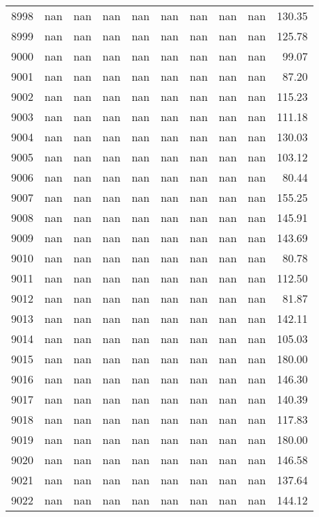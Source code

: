\begin{tabular}{lrrrrrrrrr}
8998 & nan & nan & nan & nan & nan & nan & nan & nan & 130.35 \\
8999 & nan & nan & nan & nan & nan & nan & nan & nan & 125.78 \\
9000 & nan & nan & nan & nan & nan & nan & nan & nan & 99.07 \\
9001 & nan & nan & nan & nan & nan & nan & nan & nan & 87.20 \\
9002 & nan & nan & nan & nan & nan & nan & nan & nan & 115.23 \\
9003 & nan & nan & nan & nan & nan & nan & nan & nan & 111.18 \\
9004 & nan & nan & nan & nan & nan & nan & nan & nan & 130.03 \\
9005 & nan & nan & nan & nan & nan & nan & nan & nan & 103.12 \\
9006 & nan & nan & nan & nan & nan & nan & nan & nan & 80.44 \\
9007 & nan & nan & nan & nan & nan & nan & nan & nan & 155.25 \\
9008 & nan & nan & nan & nan & nan & nan & nan & nan & 145.91 \\
9009 & nan & nan & nan & nan & nan & nan & nan & nan & 143.69 \\
9010 & nan & nan & nan & nan & nan & nan & nan & nan & 80.78 \\
9011 & nan & nan & nan & nan & nan & nan & nan & nan & 112.50 \\
9012 & nan & nan & nan & nan & nan & nan & nan & nan & 81.87 \\
9013 & nan & nan & nan & nan & nan & nan & nan & nan & 142.11 \\
9014 & nan & nan & nan & nan & nan & nan & nan & nan & 105.03 \\
9015 & nan & nan & nan & nan & nan & nan & nan & nan & 180.00 \\
9016 & nan & nan & nan & nan & nan & nan & nan & nan & 146.30 \\
9017 & nan & nan & nan & nan & nan & nan & nan & nan & 140.39 \\
9018 & nan & nan & nan & nan & nan & nan & nan & nan & 117.83 \\
9019 & nan & nan & nan & nan & nan & nan & nan & nan & 180.00 \\
9020 & nan & nan & nan & nan & nan & nan & nan & nan & 146.58 \\
9021 & nan & nan & nan & nan & nan & nan & nan & nan & 137.64 \\
9022 & nan & nan & nan & nan & nan & nan & nan & nan & 144.12 \\

\end{tabular}

